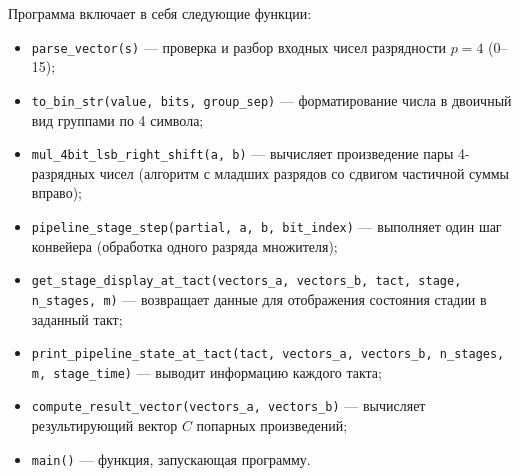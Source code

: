 Программа включает в себя следующие функции:

\begin{itemize}
    \item \texttt{parse\_vector(s)} --- проверка и разбор входных чисел разрядности $p=4$ (0--15);
    \item \texttt{to\_bin\_str(value, bits, group\_sep)} --- форматирование числа в двоичный вид группами по 4 символа;
    \item \texttt{mul\_4bit\_lsb\_right\_shift(a, b)} --- вычисляет произведение пары 4-разрядных чисел (алгоритм с младших разрядов со сдвигом частичной суммы вправо);
    \item \texttt{pipeline\_stage\_step(partial, a, b, bit\_index)} --- выполняет один шаг конвейера (обработка одного разряда множителя);
    \item \texttt{get\_stage\_display\_at\_tact(vectors\_a, vectors\_b, tact, stage, n\_stages, m)} --- возвращает данные для отображения состояния стадии в заданный такт;
    \item \texttt{print\_pipeline\_state\_at\_tact(tact, vectors\_a, vectors\_b, n\_stages, m, stage\_time)} --- выводит информацию каждого такта;
    \item \texttt{compute\_result\_vector(vectors\_a, vectors\_b)} --- вычисляет результирующий вектор $C$ попарных произведений;
    \item \texttt{main()} --- функция, запускающая программу.
\end{itemize}
